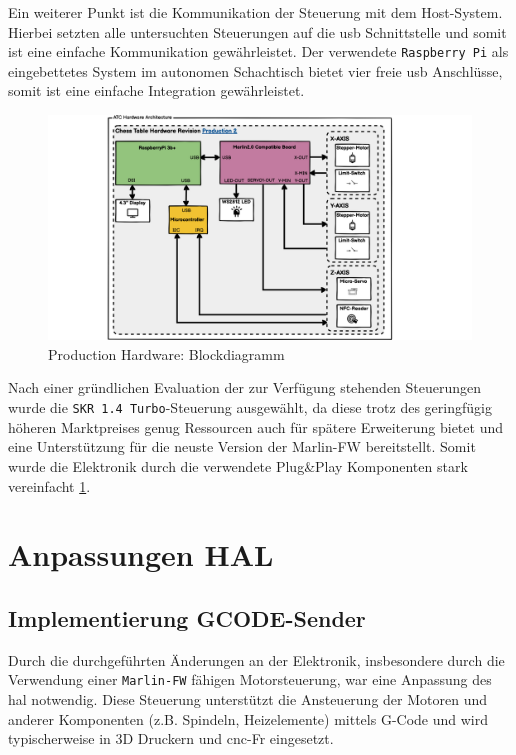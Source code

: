 Ein weiterer Punkt ist die Kommunikation der Steuerung mit dem
Host-System. Hierbei setzten alle untersuchten Steuerungen auf die
\gls{usb} Schnittstelle und somit ist eine einfache Kommunikation
gewährleistet. Der verwendete \passthrough{\lstinline!Raspberry Pi!} als
eingebettetes System im autonomen Schachtisch bietet vier freie
\gls{usb} Anschlüsse, somit ist eine einfache Integration gewährleistet.

\begin{figure}
\centering
\includegraphics{images/ATC_Hardware_Architecture_PROD.png}
\caption{Production Hardware: Blockdiagramm
\label{ATC_Hardware_Architecture_PROD}}
\end{figure}

Nach einer gründlichen Evaluation der zur Verfügung stehenden
Steuerungen wurde die \passthrough{\lstinline!SKR 1.4 Turbo!}-Steuerung
ausgewählt, da diese trotz des geringfügig höheren Marktpreises genug
Ressourcen auch für spätere Erweiterung bietet und eine Unterstützung
für die neuste Version der Marlin-FW\cite{marlinfw} bereitstellt.
Somit wurde die Elektronik durch die verwendete Plug\&Play Komponenten
stark vereinfacht \ref{ATC_Hardware_Architecture_PROD}.

\hypertarget{anpassungen-hal}{%
\section{Anpassungen HAL}\label{anpassungen-hal}}

\hypertarget{implementierung-gcode-sender}{%
\subsection{Implementierung
GCODE-Sender}\label{implementierung-gcode-sender}}

Durch die durchgeführten Änderungen an der Elektronik, insbesondere
durch die Verwendung einer
\passthrough{\lstinline!Marlin-FW!}\cite{marlinfw} fähigen
Motorsteuerung, war eine Anpassung des \gls{hal} notwendig. Diese
Steuerung unterstützt die Ansteuerung der Motoren und anderer
Komponenten (z.B. Spindeln, Heizelemente) mittels G-Code und wird
typischerweise in 3D Druckern und \gls{cnc}-Fr eingesetzt.

